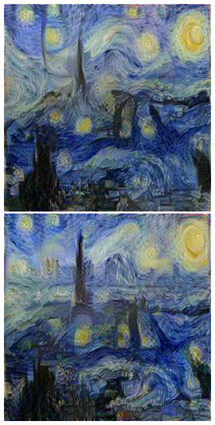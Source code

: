 \documentclass{article}
\begin{document}
\begin{figure}[!htb]
\begin{minipage}{0.2\textwidth}
\end{minipage}%
\begin{minipage}{0.2\textwidth}
\centering
\includegraphics[width=0.98\textwidth]{../Images/transfer/paris_starrynight_c_conv_3_2.jpg}
\end{minipage}%
\begin{minipage}{0.2\textwidth}
\centering
\includegraphics[width=0.98\textwidth]{../Images/transfer/paris_starrynight_1e4_500.jpg}

\end{minipage}
\end{figure}
\end{document}
